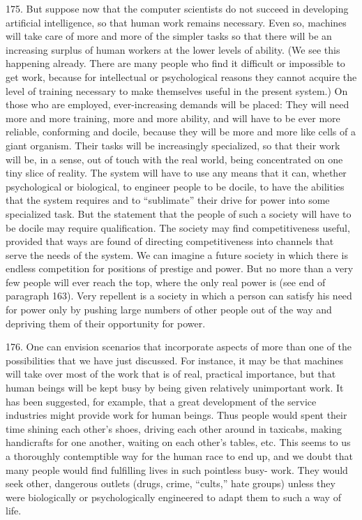 \documentclass{article}
\begin{document}
175.  But  suppose  now  that  the  computer  scientists  do  not  succeed  in  developing  artificial 
intelligence, so that human work remains necessary.  Even so, machines will take care of more and 
more of the simpler tasks so that there will be an increasing surplus of human workers at the lower 
levels of ability.  (We see this happening already.  There are many people who find it difficult or 
impossible to get work, because for intellectual or psychological reasons they cannot acquire the 
level of training necessary  to make themselves useful in the present system.) On those who are 
employed, ever-increasing demands will be placed: They will need more and more training, more 
and more ability, and will have to be ever more reliable, conforming and docile, because they will 
be more and more like cells of a giant organism.  Their tasks will be increasingly specialized, so 
that their work will be, in a sense, out of touch with the real world, being concentrated on one tiny 
slice  of  reality.   The  system  will  have  to  use  any  means  that  it  can,  whether  psychological  or  
biological,  to  engineer  people  to  be  docile,  to  have  the  abilities  that  the  system  requires  and  to  
“sublimate” their drive for power into some specialized task.  But the statement that the people of 
such a society will have to be docile may require qualification.  The society may find 
competitiveness useful, provided that ways are found of directing competitiveness into channels 
that  serve  the  needs  of  the  system.   We  can  imagine  a  future  society  in  which  there  is  endless  
competition for positions of prestige and power.   But no more than  a very few people will ever 
reach the top, where the only real power is (see end of paragraph 163).  Very repellent is a society 
in which a person can satisfy his need for power only by pushing large numbers of other people 
out of the way and depriving them of their opportunity for power. \vspace{\baselineskip}

176.  One can envision scenarios that incorporate aspects of more than one of the possibilities that 
we have just discussed.  For instance, it may be that machines will take over most of the work that 
is of real, practical importance, but that human beings will be kept busy by being given relatively 
unimportant  work.   It  has  been  suggested,  for  example,  that  a  great  development  of  the  service 
industries might provide work for human beings.  Thus people would spent their time shining each 
other’s shoes, driving each other around in taxicabs, making handicrafts for one another, waiting 
on each other’s tables, etc.  This seems to us a thoroughly contemptible way for the human race to 
end  up,  and  we  doubt  that  many  people  would  find  fulfilling  lives  in  such  pointless  busy-
work.  They would seek other, dangerous outlets (drugs, crime, “cults,” hate groups) unless they 
were biologically or psychologically engineered to adapt them to such a way of life.  \vspace{\baselineskip}
\end{document}
